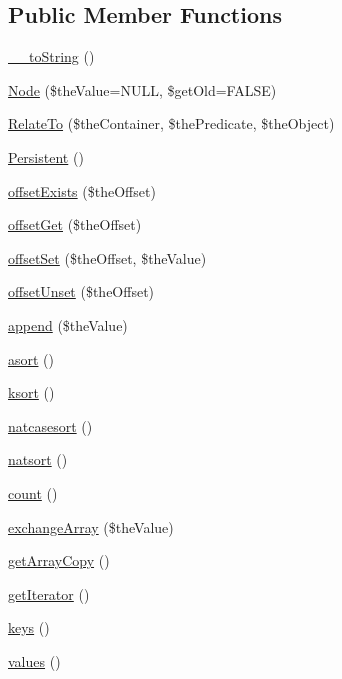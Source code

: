 \subsection*{Public Member Functions}
\begin{DoxyCompactItemize}
\item 
\hyperlink{class_c_graph_node_a59905bb321a3fb6a1540a6ffba12f2a0}{\-\_\-\-\_\-to\-String} ()
\item 
\hyperlink{class_c_graph_node_ad830025d2d6650006eb6e737bd4f32c0}{Node} (\$the\-Value=N\-U\-L\-L, \$get\-Old=F\-A\-L\-S\-E)
\item 
\hyperlink{class_c_graph_node_a287e129b287f2479b7b23dc17b9fdac5}{Relate\-To} (\$the\-Container, \$the\-Predicate, \$the\-Object)
\item 
\hyperlink{class_c_graph_node_a2f2f02ee7ded7710e6f7533611ec638b}{Persistent} ()
\item 
\hyperlink{class_c_graph_node_a8c567e73a79cddc0e3582b3bd766d980}{offset\-Exists} (\$the\-Offset)
\item 
\hyperlink{class_c_graph_node_a0a00e251025e4f7b10beae2248f03d77}{offset\-Get} (\$the\-Offset)
\item 
\hyperlink{class_c_graph_node_acf4f4240a7807ff16d81378aa282595c}{offset\-Set} (\$the\-Offset, \$the\-Value)
\item 
\hyperlink{class_c_graph_node_aab1d86d6dda1fffa9dd515b23851588a}{offset\-Unset} (\$the\-Offset)
\item 
\hyperlink{class_c_graph_node_ad840188072a10371bf6da50e4131ee88}{append} (\$the\-Value)
\item 
\hyperlink{class_c_graph_node_ab83d87984044ae781b8870c69a3ad472}{asort} ()
\item 
\hyperlink{class_c_graph_node_aee3c470e52a6ffa950984ce25f57f081}{ksort} ()
\item 
\hyperlink{class_c_graph_node_ad187a7139ae97caea978dd370d1e14a3}{natcasesort} ()
\item 
\hyperlink{class_c_graph_node_a026a72297d874a942ddda70610691a4a}{natsort} ()
\item 
\hyperlink{class_c_graph_node_a31fffee579cebb625adbee4e4f53bb48}{count} ()
\item 
\hyperlink{class_c_graph_node_a31e3d1b00e74066c6313aa2afada6392}{exchange\-Array} (\$the\-Value)
\item 
\hyperlink{class_c_graph_node_a8a47a42830cc926da243f60838a08d7f}{get\-Array\-Copy} ()
\item 
\hyperlink{class_c_graph_node_ae65101d085a003959b8ae721b63e49be}{get\-Iterator} ()
\item 
\hyperlink{class_c_graph_node_ae68945960073b8bddf5dcfc1869e4144}{keys} ()
\item 
\hyperlink{class_c_graph_node_a4505b68f38ea66b3236226531aca23ea}{values} ()
\end{DoxyCompactItemize}
